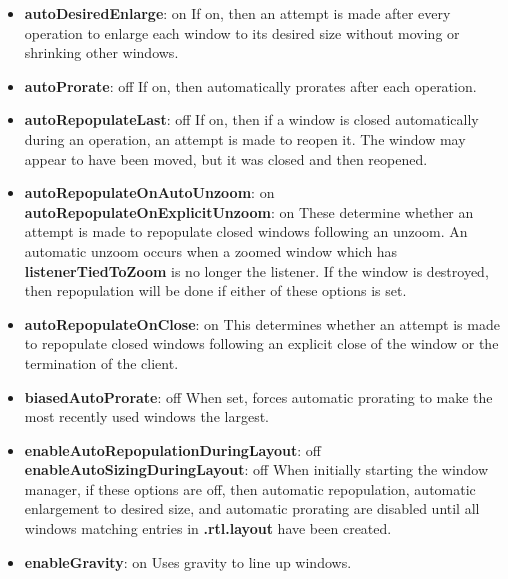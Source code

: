 \begin{itemize}
\item {\bf autoDesiredEnlarge}: on\newline{}
If on, then an attempt is made after every operation to enlarge
each window to its desired size without moving or shrinking other
windows.

\item {\bf autoProrate}: off\newline{}
If on, then automatically prorates after each operation.

\item {\bf autoRepopulateLast}: off\newline{}
If on, then if a window is closed automatically during an
operation, an attempt is made to reopen it.  The window may
appear to have been moved, but it was closed and then reopened.

\item {\bf autoRepopulateOnAutoUnzoom}: on\newline{}
{\bf autoRepopulateOnExplicitUnzoom}: on\newline{}
These determine whether an attempt is made to repopulate closed
windows following an unzoom.  An automatic unzoom occurs when a
zoomed window which has {\bf listenerTiedToZoom} is no longer the
listener.
If the window is destroyed, then repopulation will be done if
either of these options is set.

\item {\bf autoRepopulateOnClose}: on\newline{}
This determines whether an attempt is made to repopulate closed
windows following an explicit close of the window or the termination of
the client.

\item {\bf biasedAutoProrate}: off\newline{}
When set, forces automatic prorating to make the most recently used
windows the largest.

\item {\bf enableAutoRepopulationDuringLayout}: off\newline{}
{\bf enableAutoSizingDuringLayout}: off\newline{}
When initially starting the window manager, if these options are
off, then automatic repopulation, automatic enlargement to
desired size, and automatic prorating are disabled until all
windows matching entries in {\bf .rtl.layout} have been created.

\item {\bf enableGravity}: on\newline{}
Uses gravity to line up windows.


\end{itemize}
